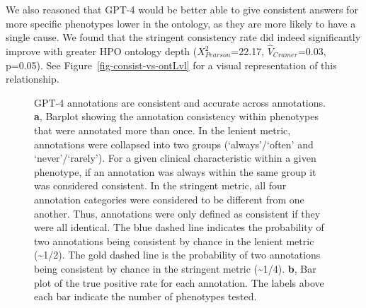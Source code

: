 \documentclass[
]{agujournal2019}
\begin{document}
We also reasoned that GPT-4 would be better able to give consistent
answers for more specific phenotypes lower in the ontology, as they are
more likely to have a single cause. We found that the stringent
consistency rate did indeed significantly improve with greater HPO
ontology depth (\(X_{Pearson}^2\)=22.17, \(\hat{V}_{Cramer}\)=0.03,
p=0.05). See Figure~\ref{fig-consist-vs-ontLvl} for a visual
representation of this relationship.

\label{cell-fig-checks}
\begin{figure}[H]


\caption{\label{fig-checks}GPT-4 annotations are consistent and accurate
across annotations. \textbf{a}, Barplot showing the annotation
consistency within phenotypes that were annotated more than once. In the
lenient metric, annotations were collapsed into two groups
(`always'/`often' and `never'/`rarely'). For a given clinical
characteristic within a given phenotype, if an annotation was always
within the same group it was considered consistent. In the stringent
metric, all four annotation categories were considered to be different
from one another. Thus, annotations were only defined as consistent if
they were all identical. The blue dashed line indicates the probability
of two annotations being consistent by chance in the lenient metric
(\textasciitilde1/2). The gold dashed line is the probability of two
annotations being consistent by chance in the stringent metric
(\textasciitilde1/4). \textbf{b}, Bar plot of the true positive rate for
each annotation. The labels above each bar indicate the number of
phenotypes tested.}

\end{figure}%
\end{document}
